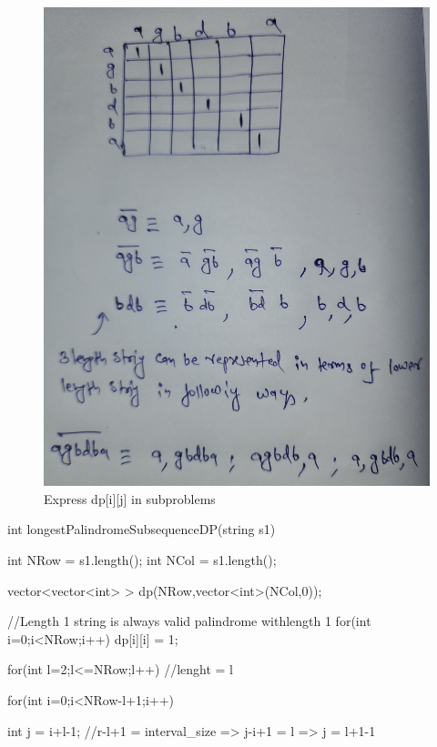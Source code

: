\begin{solution}[Iterative]
    \begin{figure}
        \centering
        \caption{Express dp[i][j] in subproblems}
        \includegraphics[width=\marginparwidth]{resources/LPS_Division2.jpg} 
    \end{figure}

    \begin{code}
        int longestPalindromeSubsequenceDP(string s1)
        {
            int NRow = s1.length();
            int NCol = s1.length();
        
            vector<vector<int> > dp(NRow,vector<int>(NCol,0));
        
            //Length 1 string is always valid palindrome withlength 1  
            for(int i=0;i<NRow;i++)
                dp[i][i] = 1;
        
            for(int l=2;l<=NRow;l++) //lenght = l
            {
                
                for(int i=0;i<NRow-l+1;i++) 
                {
                    int j = i+l-1; //r-l+1 = interval_size => j-i+1 = l => j = l+1-1
                        
}}}
\end{code}
\end{solution}
